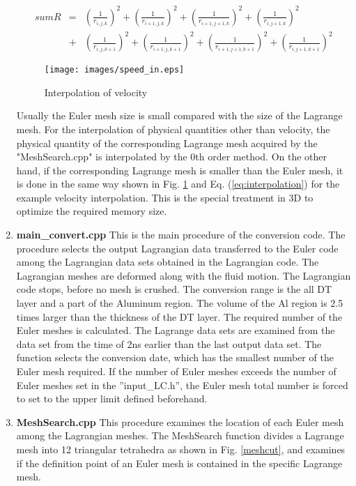 \begin{enumerate}
\begin{eqnarray}
	sumR&=&\left(\frac{1}{r_{i,j,k}}\right)^2+\left(\frac{1}{r_{i+1,j,k}}\right)^2+\left(\frac{1}{r_{i+1,j+1,k}}\right)^2+\left(\frac{1}{r_{i,j+1,k}}\right)^2\nonumber\\
	&+&\left(\frac{1}{r_{i,j,k+1}}\right)^2+\left(\frac{1}{r_{i+1,j,k+1}}\right)^2+\left(\frac{1}{r_{i+1,j+1,k+1}}\right)^2+\left(\frac{1}{r_{i,j+1,k+1}}\right)^2\nonumber
\end{eqnarray}

\begin{figure}[H]
	\centering
	\texttt{[image: images/speed\_in.eps]}
	\caption{Interpolation of velocity}\label{interpolation_speed}
\end{figure}

Usually the Euler mesh size is small compared with the size of the Lagrange mesh. For the interpolation of physical quantities other than velocity, the physical quantity of the corresponding Lagrange mesh acquired by the "MeshSearch.cpp" is interpolated by the 0th order method. On the other hand, if the corresponding Lagrange mesh is smaller than the Euler mesh, it is done in the same way shown in Fig. \ref{interpolation_speed} and Eq. (\ref{eq:interpolation}) for the example velocity interpolation. This is the special treatment in 3D to optimize the required memory size. 

\item{\bf main\_convert.cpp}
This is the main procedure of the conversion code. The procedure selects the output Lagrangian data transferred to the Euler code among the Lagrangian data sets obtained in the Lagrangian code. The Lagrangian meshes are deformed along with the fluid motion. The Lagrangian code stops, before no mesh is crushed. The conversion range is the all DT layer and a part of the Aluminum region. The volume of the Al region is 2.5 times larger than the thickness of the DT layer. The required number of the Euler meshes is calculated. The Lagrange data sets are examined from the data set from the time of 2ns earlier than the last output data set. The function selects the conversion date, which has the smallest number of the Euler mesh required. If the number of Euler meshes exceeds the number of Euler meshes set in the ''input\_LC.h'', the Euler mesh total number is forced to set to the upper limit defined beforehand. 



\item{\bf MeshSearch.cpp}
This procedure examines the location of each Euler mesh among the Lagrangian meshes. The MeshSearch function divides a Lagrange mesh into 12 triangular tetrahedra as shown in Fig. \ref{meshcut}, and examines if the definition point of an Euler mesh is contained in the specific Lagrange mesh. 


\end{enumerate}
